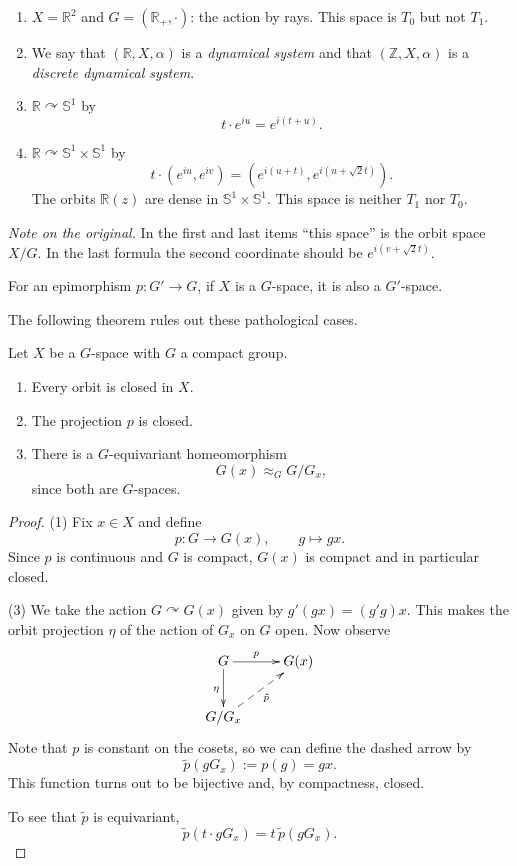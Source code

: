 \begin{example}
\label{example-pathological-orbit-spaces}
\begin{enumerate}
\item $X=\mathbb{R}^2$ and
$G=(\mathbb{R}_+,\cdot)$: the action by
rays. This space is $T_0$ but not
$T_1$.
\item We say that
$(\mathbb{R},X,\alpha)$ is a
{\it dynamical system} and that
$(\mathbb{Z},X,\alpha)$ is a
{\it discrete dynamical system}.
\item
$\mathbb{R}\curvearrowright\mathbb{S}^1$
by
$$
t\cdot e^{iu}=e^{i(t+u)}.
$$
\item $\mathbb{R}\curvearrowright
\mathbb{S}^1\times\mathbb{S}^1$ by
$$
t\cdot(e^{iu},e^{iv})
=(e^{i(u+t)},e^{i(u+\sqrt{2}t)}).
$$
The orbits $\mathbb{R}(z)$ are dense in
$\mathbb{S}^1\times\mathbb{S}^1$. This
space is neither $T_1$ nor $T_0$.
\end{enumerate}
\end{example}

\noindent
{\it Note on the original.} In the
first and last items ``this space'' is
the orbit space $X/G$. In the last
formula the second coordinate should be
$e^{i(v+\sqrt{2}t)}$.

\begin{remark}
\label{remark-pullback-action}
For an epimorphism $p:G'\to G$, if $X$
is a $G$-space, it is also a
$G'$-space.
\end{remark}

The following theorem rules out these
pathological cases.

\begin{theorem}
\label{theorem-compact-group-orbits}
Let $X$ be a $G$-space with $G$ a
compact group.
\begin{enumerate}
\item Every orbit is closed in $X$.
\item The projection $p$ is closed.
\item There is a $G$-equivariant
homeomorphism
$$
G(x)\approx_GG/G_x,
$$
since both are $G$-spaces.
\end{enumerate}
\end{theorem}

\begin{proof}
(1) Fix $x\in X$ and define
$$
p:G\to G(x),
\qquad
g\mapsto gx.
$$
Since $p$ is continuous and $G$ is
compact, $G(x)$ is compact and in
particular closed.

(3) We take the action
$G\curvearrowright G(x)$ given by
$g'(gx)=(g'g)x$. This makes the orbit
projection $\eta$ of the action of
$G_x$ on $G$ open. Now observe
$$
\xymatrix{
G \ar[r]^-{p} \ar[d]_{\eta}
  & G(x) \\
G/G_x \ar@{-->}[ur]_{\tilde{p}}
}
$$
Note that $p$ is constant on the
cosets, so we can define the dashed
arrow by
$$
\tilde{p}(gG_x):=p(g)=gx.
$$
This function turns out to be bijective
and, by compactness, closed.

To see that $\tilde{p}$ is equivariant,
$$
\tilde{p}(t\cdot gG_x)
=t\,\tilde{p}(gG_x).
$$
\end{proof}

